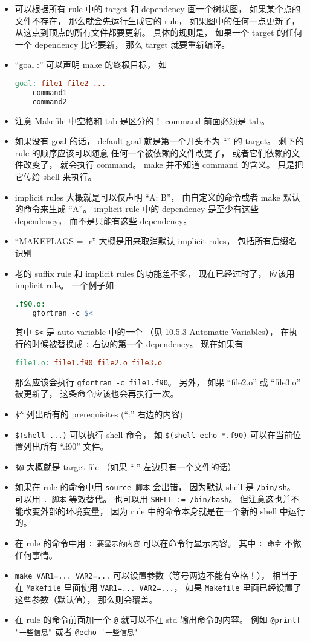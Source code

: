 \begin{itemize}
\item 可以根据所有 rule 中的 target 和 dependency 画一个树状图， 如果某个点的文件不存在， 那么就会先运行生成它的 rule， 如果图中的任何一点更新了， 从这点到顶点的所有文件都要更新。 具体的规则是， 如果一个 target 的任何一个 dependency 比它要新， 那么 target 就要重新编译。
\item “goal :” 可以声明 make 的终极目标， 如
\begin{lstlisting}[language=makefile]
goal: file1 file2 ...
	command1
	command2
\end{lstlisting}
\item 注意 Makefile 中空格和 tab 是区分的！ command 前面必须是 tab。
\item 如果没有 goal 的话， default goal 就是第一个开头不为 “.” 的 target。 剩下的 rule 的顺序应该可以随意
任何一个被依赖的文件改变了， 或者它们依赖的文件改变了， 就会执行 command。 make 并不知道 command 的含义。 只是把它传给 shell 来执行。
\item implicit rules 大概就是可以仅声明 “A: B”， 由自定义的命令或者 make 默认的命令来生成 “A”。 implicit rule 中的 dependency 是至少有这些 dependency， 而不是只能有这些 dependency。
\item “MAKEFLAGS = -r” 大概是用来取消默认 implicit rules， 包括所有后缀名识别
\item 老的 suffix rule 和 implicit rules 的功能差不多， 现在已经过时了， 应该用 implicit rule。 一个例子如
\begin{lstlisting}[language=makefile]
.f90.o:
	gfortran -c $<
\end{lstlisting}
其中 \verb|$<| 是 auto variable 中的一个 （见 10.5.3 Automatic Variables）， 在执行的时候被替换成 \verb|:| 右边的第一个 dependency。 现在如果有
\begin{lstlisting}[language=makefile]
file1.o: file1.f90 file2.o file3.o
\end{lstlisting}
那么应该会执行 \verb|gfortran -c file1.f90|。 另外， 如果 “file2.o” 或 “file3.o” 被更新了， 这条命令应该也会再执行一次。
\item \verb|$^| 列出所有的 prerequisites (“:” 右边的内容)
\item \verb|$(shell ...)| 可以执行 shell 命令， 如 \verb|$(shell echo *.f90)| 可以在当前位置列出所有 “.f90” 文件。
\item \verb|$@| 大概就是 target file （如果 “:” 左边只有一个文件的话）
\item 如果在 rule 的命令中用 \verb|source 脚本| 会出错， 因为默认 shell 是 \verb|/bin/sh|。 可以用 \verb|. 脚本| 等效替代。 也可以用 \verb|SHELL := /bin/bash|。 但注意这也并不能改变外部的环境变量， 因为 rule 中的命令本身就是在一个新的 shell 中运行的。
\item 在 rule 的命令中用 \verb|: 要显示的内容| 可以在命令行显示内容。 其中 \verb|: 命令| 不做任何事情。
\item \verb|make VAR1=... VAR2=...| 可以设置参数（等号两边不能有空格！）， 相当于在 \verb|Makefile| 里面使用 \verb|VAR1=... VAR2=...|， 如果 \verb|Makefile| 里面已经设置了这些参数（默认值）， 那么则会覆盖。 
\item 在 rule 的命令前面加一个 \verb|@| 就可以不在 std 输出命令的内容。 例如 \verb|@printf "一些信息"| 或者 \verb|@echo '一些信息'|
\end{itemize}

